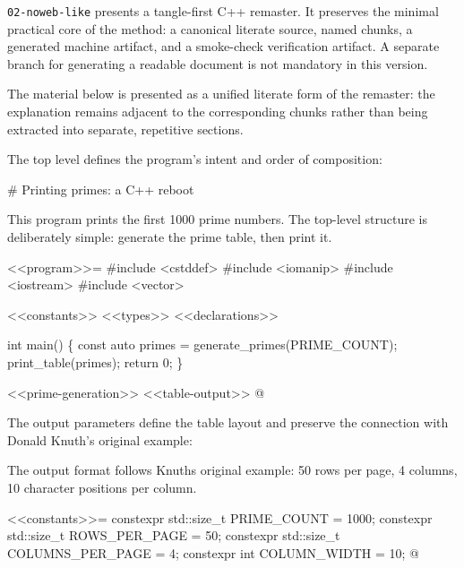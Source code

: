 \documentclass{ZGJournalArticle_2026}
\newenvironment{Shaded}{}{}
\newcommand{\NormalTok}[1]{#1}
\begin{document}
\texttt{02-noweb-like} presents a tangle-first C++ remaster. It
preserves the minimal practical core of the method: a canonical literate
source, named chunks, a generated machine artifact, and a smoke-check
verification artifact. A separate branch for generating a readable
document is not mandatory in this version.

The material below is presented as a unified literate form of the
remaster: the explanation remains adjacent to the corresponding chunks
rather than being extracted into separate, repetitive sections.

The top level defines the program's intent and order of composition:

\begin{Shaded}
\begin{Highlighting}[]
\NormalTok{\# Printing primes: a C++ reboot}

\NormalTok{This program prints the first 1000 prime numbers.}
\NormalTok{The top{-}level structure is deliberately simple:}
\NormalTok{generate the prime table, then print it.}

\NormalTok{\textless{}\textless{}program\textgreater{}\textgreater{}=}
\NormalTok{\#include \textless{}cstddef\textgreater{}}
\NormalTok{\#include \textless{}iomanip\textgreater{}}
\NormalTok{\#include \textless{}iostream\textgreater{}}
\NormalTok{\#include \textless{}vector\textgreater{}}

\NormalTok{\textless{}\textless{}constants\textgreater{}\textgreater{}}
\NormalTok{\textless{}\textless{}types\textgreater{}\textgreater{}}
\NormalTok{\textless{}\textless{}declarations\textgreater{}\textgreater{}}

\NormalTok{int main() \{}
\NormalTok{    const auto primes = generate\_primes(PRIME\_COUNT);}
\NormalTok{    print\_table(primes);}
\NormalTok{    return 0;}
\NormalTok{\}}

\NormalTok{\textless{}\textless{}prime{-}generation\textgreater{}\textgreater{}}
\NormalTok{\textless{}\textless{}table{-}output\textgreater{}\textgreater{}}
\NormalTok{@}
\end{Highlighting}
\end{Shaded}

The output parameters define the table layout and preserve the
connection with Donald Knuth's original example:

\begin{Shaded}
\begin{Highlighting}[]
\NormalTok{The output format follows Knuth\textquotesingle{}s original example:}
\NormalTok{50 rows per page, 4 columns, 10 character positions per column.}

\NormalTok{\textless{}\textless{}constants\textgreater{}\textgreater{}=}
\NormalTok{constexpr std::size\_t PRIME\_COUNT = 1000;}
\NormalTok{constexpr std::size\_t ROWS\_PER\_PAGE = 50;}
\NormalTok{constexpr std::size\_t COLUMNS\_PER\_PAGE = 4;}
\NormalTok{constexpr int COLUMN\_WIDTH = 10;}
\NormalTok{@}
\end{Highlighting}
\end{Shaded}
\end{document}

